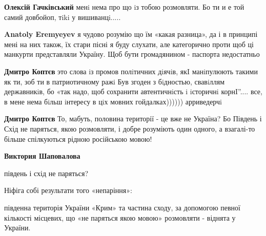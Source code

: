 \begin{itemize}
\begin{itemize}
\begin{itemize}
\textbf{Олексій Гачківський} менi нема про що iз тобою розмовляти. Бо ти и е той самий довбойоп, тiki у вишиванцi.....

 
\textbf{Anatoly Eremyeyev} я чудово розумію що їм «какая разница», да і в принципі мені на них також, їх стари пісні я буду слухати, але категорично проти щоб ці манкурти представляли Україну. Щоб бути громадянином - паспорта недостатньо

 
\textbf{Дмитро Коптєв} это слова iз промов полiтичних дiячiв, якI манiпулюють такими як ти, зоб ти в патриотичному ражi Був згоден з бiдностью, свавiллям державникiв, бо «так надо, щоб сохранити автентичнiсть i iсторичнi корнI”.... все, в мене нема бiльш iнтересу в цiх мовних гойдалках)))))) арриведерчi

 
\textbf{Дмитро Коптєв} То, мабуть, половина території - це вже не Україна? Бо Південь і Схід не паряться, якою розмовляти, і добре розуміють один одного, а взагалі-то більше спілкуються рідною російською мовою!

 
\textbf{Виктория Шаповалова} 

південь і схід не паряться?

Ніфіга собі результати того «непаріння»:

південна територія України «Крим» та частина сходу, за допомогою певної
кількості місцевих, що «не паряться якою мовою» розмовляти - віднята у України.


\end{itemize}
\end{itemize}
\end{itemize}
